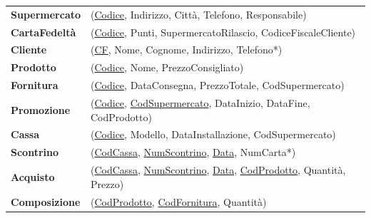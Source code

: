 \documentclass{article}
\begin{document}
\begin{tabular}{ll}
	\textbf{Supermercato} & (\underline{Codice}, Indirizzo, Città, Telefono, Responsabile) \\
	
	\textbf{CartaFedeltà} & (\underline{Codice}, Punti, SupermercatoRilascio, CodiceFiscaleCliente) \\
	
	\textbf{Cliente} & (\underline{CF}, Nome, Cognome, Indirizzo, Telefono*) \\
	
	\textbf{Prodotto} & (\underline{Codice}, Nome, PrezzoConsigliato) \\
	
	\textbf{Fornitura} & (\underline{Codice}, DataConsegna, PrezzoTotale, CodSupermercato) \\
	
	\textbf{Promozione} & (\underline{Codice}, \underline{CodSupermercato}, DataInizio, DataFine, CodProdotto) \\
	
	\textbf{Cassa} & (\underline{Codice}, Modello, DataInstallazione, CodSupermercato) \\
	
	\textbf{Scontrino} & (\underline{CodCassa}, \underline{NumScontrino}, \underline{Data}, NumCarta*) \\
	
	\textbf{Acquisto} & (\underline{CodCassa}, \underline{NumScontrino}, \underline{Data}, \underline{CodProdotto}, Quantità, Prezzo) \\
	
	\textbf{Composizione} & (\underline{CodProdotto}, \underline{CodFornitura}, Quantità) \\
\end{tabular}
\end{document}

